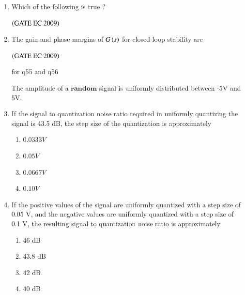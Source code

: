 \documentclass[journal,12pt,onecolumn]{IEEEtran}
\theoremstyle{remark}
\begin{document}
\begin{enumerate}[start=1, label={Q\arabic*.}]
\item Which of the following is true ?
\begin{enumerate}
\end{enumerate}
\hfill $\left(\text{GATE EC 2009}\right)$

\item The gain and phase margins of $G\left(s\right)$ for closed loop stability are
\begin{enumerate}
\end{enumerate}
\hfill $\left(\text{GATE EC 2009}\right)$

for q55 and q56 

The amplitude of a $\textbf{random}$ signal is uniformly distributed between -5V and 5V.

\item If the signal to quantization noise ratio required in uniformly quantizing the signal is 43.5 dB, the step size of the quantization is approximately 
\begin{enumerate}
    \item $0.0333 V$
    \item $0.05 V$
    \item $0.0667 V$
    \item $0.10 V$
\end{enumerate}

\item If the positive values of the signal are uniformly quantized with a step size of 0.05 V, and the negative values are uniformly quantized with a step size of 0.1 V, the resulting signal to quantization noise ratio is approximately 
\begin{enumerate}
    \item 46 dB
    \item 43.8 dB
    \item 42 dB
    \item 40 dB
\end{enumerate}


\end{enumerate}
\end{document}
